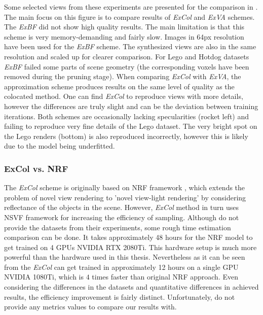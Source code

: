 Some selected views from these experiments are presented for the comparison in .
The main focus on this figure is to compare results of \textit{ExCol} and \textit{ExVA} schemes.
The \textit{ExBF} did not show high quality results.
The main limitation is that this scheme is very memory-demanding and fairly slow.
Images in 64px resolution have been used for the \textit{ExBF} scheme.
The synthesized views are also in the same resolution and scaled up for clearer comparison.
For Lego and Hotdog datasets \textit{ExBF} failed some parts of scene geometry 
(the corresponding voxels have been removed during the pruning stage).
When comparing \textit{ExCol} with \textit{ExVA},
the approximation scheme produces results on the same level of quality as the colocated method.
One can find \textit{ExCol} to reproduce views with more details,
however the differences are truly slight and can be the deviation between training iterations.
Both schemes are occasionally lacking specularities (rocket left)
and failing to reproduce very fine details of the Lego dataset.
The very bright spot on the Lego renders (bottom) is also reproduced incorrectly,
however this is likely due to the model being underfitted.

\subsubsection{ExCol vs. NRF}

The \textit{ExCol} scheme is originally based on NRF framework \cite{bi2020neural},
which extends the problem of novel view rendering to
'novel view-light rendering' by considering reflectance of the objects in the scene.
However, \textit{ExCol} method in turn uses NSVF framework for increasing the efficiency of sampling.
Although \cite{bi2020neural} do not provide the datasets from their experiments,
some rough time estimation comparison can be done.
It takes approximately 48 hours for the NRF model to get trained on 4 GPUs NVIDIA RTX 2080Ti.
This hardware setup is much more powerful than the hardware used in this thesis.
Nevertheless as it can be seen from 
the \textit{ExCol} can get trained in approximately 12 hours on a single GPU NVIDIA 1080Ti,
which is $4$ times faster than original NRF approach.
Even considering the differences in the datasets and quantitative differences in achieved results,
the efficiency improvement is fairly distinct.
Unfortunately, \cite{bi2020neural} do not provide any metrics values to compare our results with.




